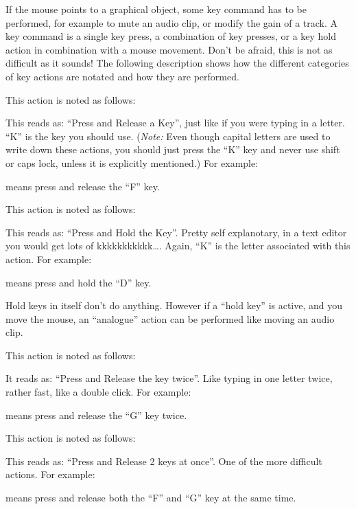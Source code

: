 If the mouse points to a graphical object, some key command has to be performed, for example to mute an audio clip, or modify the gain of a track. A key command is a single key press, a combination of key presses, or a key hold action in combination with a mouse movement. Don't be afraid, this is not as difficult as it sounds! The following description shows how the different categories of key actions are notated and how they are performed.

This action is noted as follows:
\begin{quotation}
\end{quotation}
This reads as: ``Press and Release a Key'', just like if you were typing in a letter.
``K'' is the key you should use. (\emph{Note:} Even though capital letters are used to write down these actions, you should just press the ``K'' key and never use shift or caps lock, unless it is explicitly mentioned.) For example:
\begin{quotation}
\end{quotation}
means press and release the ``F'' key.

This action is noted as follows:
\begin{quotation}
\end{quotation}
This reads as: ``Press and Hold the Key''. Pretty self explanotary, in a text editor you would get lots of kkkkkkkkkkk\dots.
Again, ``K'' is the letter associated with this action. For example:
\begin{quotation}
\end{quotation}
means press and hold the ``D'' key.

Hold keys in itself don't do anything. However if a ``hold key'' is active, and you move the mouse, an ``analogue'' action can be performed like moving an audio clip.

This action is noted as follows:
\begin{quotation}
\end{quotation}
It reads as: ``Press and Release the key twice''. Like typing in one letter twice, rather fast, like a double click. For example:
\begin{quotation}
\end{quotation}
means press and release the ``G'' key twice.

This action is noted as follows:
\begin{quotation}
\end{quotation}
This reads as: ``Press and Release 2 keys at once''. One of the more difficult actions. For example:
\begin{quotation}
\end{quotation}
means press and release both the ``F'' and ``G'' key at the same time.

